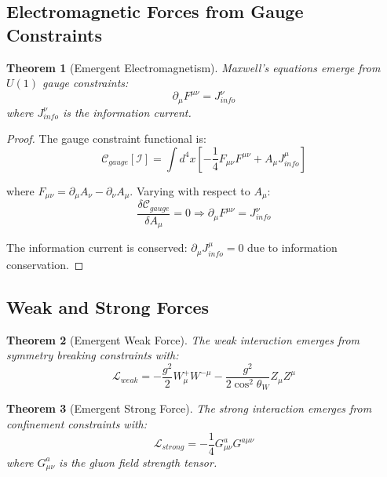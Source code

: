 \documentclass[12pt,a4paper]{article}
\newtheorem{theorem}{Theorem}[section]
\begin{document}
\subsection{Electromagnetic Forces from Gauge Constraints}

\begin{theorem}[Emergent Electromagnetism]
Maxwell's equations emerge from $U(1)$ gauge constraints:
\begin{equation}
\partial_\mu F^{\mu\nu} = J^\nu_{info}
\end{equation}
where $J^\nu_{info}$ is the information current.
\end{theorem}

\begin{proof}
The gauge constraint functional is:
\begin{equation}
\mathcal{C}_{gauge}[\mathcal{I}] = \int d^4x \left[ -\frac{1}{4} F_{\mu\nu}F^{\mu\nu} + A_\mu J^\mu_{info} \right]
\end{equation}

where $F_{\mu\nu} = \partial_\mu A_\nu - \partial_\nu A_\mu$. Varying with respect to $A_\mu$:
\begin{equation}
\frac{\delta \mathcal{C}_{gauge}}{\delta A_\mu} = 0 \Rightarrow \partial_\mu F^{\mu\nu} = J^\nu_{info}
\end{equation}

The information current is conserved: $\partial_\mu J^\mu_{info} = 0$ due to information conservation.
\end{proof}

\subsection{Weak and Strong Forces}

\begin{theorem}[Emergent Weak Force]
The weak interaction emerges from symmetry breaking constraints with:
\begin{equation}
\mathcal{L}_{weak} = -\frac{g^2}{2} W_\mu^+ W^{-\mu} - \frac{g^2}{2\cos^2\theta_W} Z_\mu Z^\mu
\end{equation}
\end{theorem}

\begin{theorem}[Emergent Strong Force]
The strong interaction emerges from confinement constraints with:
\begin{equation}
\mathcal{L}_{strong} = -\frac{1}{4} G^a_{\mu\nu} G^{a\mu\nu}
\end{equation}
where $G^a_{\mu\nu}$ is the gluon field strength tensor.
\end{theorem}
\end{document}
